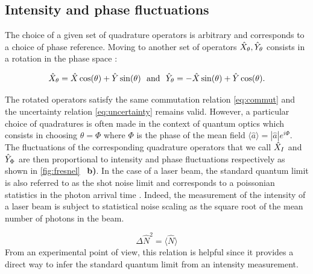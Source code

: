 \subsection{Intensity and phase fluctuations}

The choice of a given set of quadrature operators is arbitrary and corresponds to a choice of phase reference.
Moving to another set of operators $\hat{X}_{\theta},\hat{Y}_{\theta}$ consists in a rotation in the phase space :

\begin{equation}
    \hat{X}_{\theta} = \hat{X} \cos(\theta) + \hat{Y} \sin(\theta) \ \ \mathrm{and} \ \
    \hat{Y}_{\theta} = -\hat{X} \sin(\theta) + \hat{Y} \cos(\theta).
\end{equation}

The rotated operators satisfy the same commutation relation \ref{eq:commut} and the uncertainty relation \ref{eq:uncertainty} remains valid. 
However, a particular choice of quadratures is often made in the context of quantum optics \cite{grynberg_aspect_fabre} which consists in
choosing $\theta=\Phi$ where $\Phi$ is the phase of the mean field $\langle \hat{a}\rangle= |\hat{a}|e^{i\Phi}$.  The fluctuations of the corresponding quadrature
operators that we call $\hat{X}_{I}$ and $\hat{Y}_{\Phi}$ are then proportional to intensity and phase fluctuations respectively as shown in \autoref{fig:fresnel} ~\textbf{b)}. In the case of 
a laser beam, the standard quantum limit is also referred to as the shot noise limit and corresponds to a poissonian statistics in the photon arrival time \cite{grynberg_aspect_fabre}.
Indeed, the measurement of the intensity of a laser beam is subject to statistical noise scaling as the square root of the mean number of photons in the beam.

\begin{equation}
    \label{eq:shotnoise}
    \Delta \hat{N}^2 = \langle \hat{N}\rangle
\end{equation}
From an experimental point of view, this relation is helpful since it provides a direct way to infer the standard quantum limit from an intensity measurement.   


